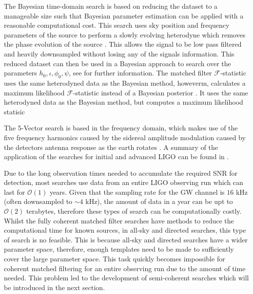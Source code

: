 The Bayesian time-domain search is based on reducing the dataset to a manageable size such that Bayesian parameter estimation can be applied with a reasonable computational cost. 
This search uses sky position and frequency parameters of the source to perform a slowly evolving heterodyne which removes the phase evolution of the source \citep{dupuis2005BayesianEstimation}.
This allows the signal to be low pass filtered and heavily downsampled without losing any of the signals information.
This reduced dataset can then be used in a Bayesian approach to search over the parameters $h_0, \iota, \phi_0, \psi$, see \citep{dupuis2005BayesianEstimation} for further information.
The matched filter $\mathcal{F}$-statistic uses the same heterodyned data as the Bayesian method, howeverm, calculates a maximum likelihood $\mathcal{F}$-statistic instead of a Bayesian posterior \citep{schutz1998DataAnalysis,prix2007SearchContinuous, aasi2014GRAVITATIONALWAVES}. It uses the same heterodyned data as the Bayesian method, but computes a maximum likelihood statisic

The 5-Vector search is based in the frequency domain, which makes use of the five frequency harmonics caused by the sidereal amplitude modulation caused by the detectors antenna response as the earth rotates \citep{astone2010MethodDetection,aasi2014GRAVITATIONALWAVES}. 
A summary of the application of the searches for initial and advanced \gls{LIGO} can be found in \citep{aasi2014GRAVITATIONALWAVES,abbott2019SearchesGravitationala}.

Due to the long observation times needed to accumulate the required \gls{SNR} for detection, most searches use data from an entire \gls{LIGO} observing run which can last for $\mathcal{O}(1)$ years.
Given that the sampling rate for the \gls{GW} channel is $16$ kHz (often downsampled to $\sim 4$ kHz), the amount of data in a year can be upt to $\mathcal{O}(2)$ terabytes, therefore these types of search can be computationally costly. 
Whilst the fully coherent matched filter searches have methods to reduce the computational time for known sources, in all-sky and directed searches, this type of search is no feasible. 
This is because all-sky and directed searches have a wider parameter space, therefore, enough templates need to be made to sufficiently cover the large parameter space. 
This task quickly becomes impossible for coherent matched filtering for an entire observing run due to the amount of time needed. This problem led to the development of semi-coherent searches which will be introduced in the next section. 

